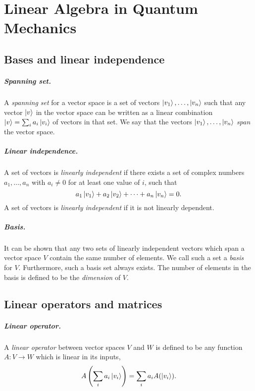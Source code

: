 \chapter{Linear Algebra in Quantum Mechanics}

\section{Bases and linear independence}

\paragraph{Spanning set.} A \emph{spanning set} for a vector space is a set of
vectors $\ket{v_1}, \ldots, \ket{v_n}$ such that any vector $\ket{v}$ in the
vector space can be written as a linear combination $\ket{v} = \sum_i a_i
\ket{v_i}$ of vectors in that set. We say that the vectors $\ket{v_1}, \ldots,
\ket{v_n}$ \emph{span} the vector space.

\paragraph{Linear independence.} A set of vectors is \emph{linearly
independent} if there exists a set of complex numbers $a_1, \ldots, a_n$ with
$a_i \neq 0$ for at least one value of $i$, such that \begin{equation}
  a_1\ket{v_1} + a_2\ket{v_2} + \cdots + a_n\ket{v_n} = 0. \label{eq:lin-ind}
\end{equation} A set of vectors is \emph{linearly independent} if it is not
linearly dependent.

\paragraph{Basis.} It can be shown that any two sets of linearly independent
vectors which span a vector space $V$ contain the same number of elements. We
call such a set a \emph{basis} for $V$. Furthermore, such a basis set always
exists. The number of elements in the basis is defined to be the
\emph{dimension} of $V$.

\section{Linear operators and matrices}

\paragraph{Linear operator.} A \emph{linear operator} between vector spaces $V$
and $W$ is defined to be any function $A : V \rightarrow W$ which is linear in
its inputs, \begin{equation}
  A\left(\sum_i a_i\ket{v_i} \right) = \sum_i a_i A(\ket{v_i}).
    \label{eq:lin-op}
\end{equation}

